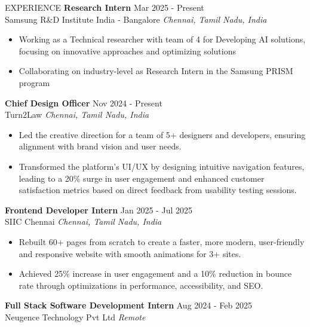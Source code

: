 \documentclass{resume} %
\begin{document}






\begin{rSection}{EXPERIENCE}
    \textbf{Research Intern} \hfill Mar 2025 - Present\\
Samsung R\&D Institute India - Bangalore \hfill \textit{Chennai, Tamil Nadu, India}



\begin{itemize}
\itemsep -3pt{}
\item Working as a Technical researcher with team of 4 for Developing AI solutions, focusing on innovative approaches and optimizing solutions
\item Collaborating on industry-level as Research Intern in the Samsung PRISM program
\end{itemize}
\textbf{Chief Design Officer} \hfill Nov 2024 - Present\\
Turn2Law \hfill \textit{Chennai, Tamil Nadu, India}



\begin{itemize}
\itemsep -3pt{}
\item Led the creative direction for a team of 5+ designers and developers, ensuring alignment with brand vision and user needs.
\item Transformed the platform’s UI/UX by designing intuitive navigation features, leading to a 20\% surge in user engagement and enhanced customer satisfaction metrics based on direct feedback from usability testing sessions.
\end{itemize}
\textbf{Frontend Developer Intern} \hfill Jan 2025 - Jul 2025\\
SIIC Chennai \hfill \textit{Chennai, Tamil Nadu, India}



\begin{itemize}
\itemsep -3pt{}
\item Rebuilt 60+ pages from scratch to create a faster, more modern, user-friendly and responsive website with smooth animations for 3+ sites.
\item Achieved 25\% increase in user engagement and a 10\% reduction in bounce rate through optimizations in performance, accessibility, and SEO.
\end{itemize}
\textbf{Full Stack Software Development Intern} \hfill Aug 2024 - Feb 2025\\
Neugence Technology Pvt Ltd \hfill \textit{Remote}




\end{rSection}
\end{document}
